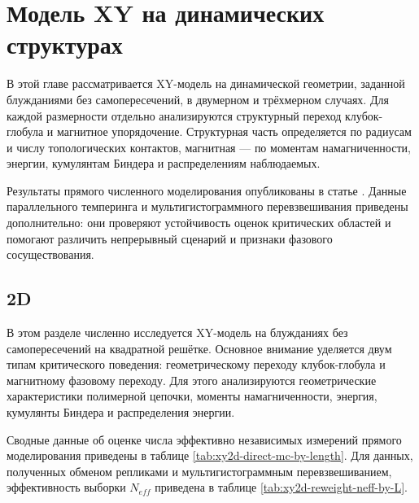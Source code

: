 
 \chapter{Модель XY на динамических структурах}
 \label{ch:ch4}
 
 
 В этой главе рассматривается XY-модель на динамической геометрии, заданной блужданиями без самопересечений, в двумерном и трёхмерном случаях.
Для каждой размерности отдельно анализируются структурный переход клубок-глобула и магнитное упорядочение. 
Структурная часть определяется по радиусам и числу топологических контактов, магнитная --- по моментам намагниченности, энергии, кумулянтам Биндера и распределениям наблюдаемых.

 Результаты прямого численного моделирования опубликованы в статье \cite{rp7y-13mp}. 
Данные параллельного темперинга и мультигистограммного перевзвешивания приведены дополнительно: они проверяют устойчивость оценок критических областей и помогают различить непрерывный сценарий и признаки фазового сосуществования.
 
 
  \section{2D}
  
  В этом разделе численно исследуется XY-модель на блужданиях без самопересечений на квадратной решётке.
   Основное внимание уделяется двум типам критического поведения: геометрическому переходу клубок-глобула и магнитному фазовому переходу. 
   Для этого анализируются геометрические характеристики полимерной цепочки, моменты намагниченности, энергия, кумулянты Биндера и распределения энергии.
   
   
   
   Сводные данные об оценке числа эффективно независимых измерений прямого моделирования приведены в таблице \ref{tab:xy2d-direct-mc-by-length}.
   Для данных, полученных обменом репликами и мультигистограммным перевзвешиванием, эффективность выборки   $N_{eff}$   приведена в таблице \ref{tab:xy2d-reweight-neff-by-L}.
   
   
   
